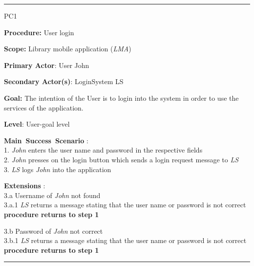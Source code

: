 \vspace{0.5cm}
\hrule
\begin{lyxlist}{PC1}
\small{
\item [\textbf{Procedure:}] User login
\item [\textbf{Scope:}] Library mobile application (\emph{LMA})
\item [\textbf{Primary Actor}:] User John
\item [\textbf{Secondary Actor(s)}:] LoginSystem LS
\item [\textbf{Goal:}] The intention of the User is to login into the system in
order to use the services of the application.
\item [\textbf{Level}:] User-goal level
\item [\textbf{Main~Success~Scenario}]:\\
1. \emph{John} enters the user name and password in the respective fields\\
2. \emph{John} presses on the login button which sends a login request message
to \emph{LS}\\
3. \emph{LS} logs \emph{John} into the application\\


\item [\textbf{Extensions}]:\\
3.a Username of \emph{John} not found\\
\hspace*{0.5cm} 3.a.1 \emph{LS} returns a message stating that the user name
or password is not correct \\
\hspace*{0.5cm} \textbf{procedure returns to step 1}

3.b Password of \emph{John} not correct \\
\hspace*{0.5cm} 3.b.1 \emph{LS} returns a message stating that the user name
or password is not correct \\
\hspace*{0.5cm} \textbf{procedure returns to step 1}

}

\end{lyxlist}
\hrule

%

